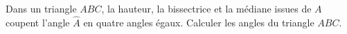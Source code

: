 Dans un triangle $ABC$, la hauteur, la bissectrice et la médiane issues de $A$ coupent l'angle $\hat{A}$ en quatre angles égaux. Calculer les angles du triangle $ABC$.
